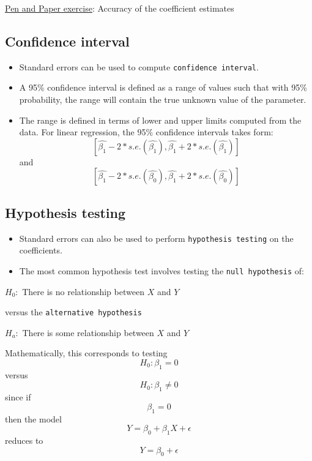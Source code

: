 \documentclass[]{article}
\providecommand{\tightlist}{%
  \setlength{\itemsep}{0pt}\setlength{\parskip}{0pt}}
\begin{document}
\href{pen-and-paper-plasma-volume.pdf}{Pen and Paper exercise}: Accuracy
of the coefficient estimates

\hypertarget{confidence-interval}{%
\subsection{Confidence interval}\label{confidence-interval}}

\begin{itemize}
\tightlist
\item
  Standard errors can be used to compute \texttt{confidence\ interval}.
\item
  A 95\% confidence interval is defined as a range of values such that
  with 95\% probability, the range will contain the true unknown value
  of the parameter.
\item
  The range is defined in terms of lower and upper limits computed from
  the data. For linear regression, the 95\% confidence intervals takes
  form:
  \[[\hat{\beta_1}-2*s.e.(\hat{\beta_1}), \hat{\beta_1}+2*s.e.(\hat{\beta_1})]\]
  and
  \[[\hat{\beta_1}-2*s.e.(\hat{\beta_0}), \hat{\beta_1}+2*s.e.(\hat{\beta_0})]\]
\end{itemize}

\hypertarget{hypothesis-testing-1}{%
\subsection{Hypothesis testing}\label{hypothesis-testing-1}}

\begin{itemize}
\tightlist
\item
  Standard errors can also be used to perform
  \texttt{hypothesis\ testing} on the coefficients.
\item
  The most common hypothesis test involves testing the
  \texttt{null\ hypothesis} of: \newline
\end{itemize}

\(H_0:\) There is no relationship between \(X\) and \(Y\) \newline

versus the \texttt{alternative\ hypothesis} \newline

\(H_a:\) There is some relationship between \(X\) and \(Y\)

Mathematically, this corresponds to testing \[H_0: \beta_1=0\] versus
\[H_0: \beta_1\neq0\] since if \[\beta_1=0\] then the model
\[Y=\beta_0+\beta_1X + \epsilon\] reduces to \[Y=\beta_0 + \epsilon\]
\end{document}
